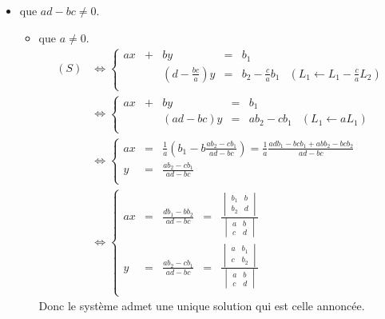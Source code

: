 \documentclass{article}
\renewenvironment{question_kholle}[2][ ]
{
	\subsection{\texorpdfstring{#2}{}}
	\notblank{#1}
	{
		\noindent #1
		\bigbreak
	}
	{}
	\begin{proof}
}
{
	\end{proof}
}
\begin{document}
\begin{question_kholle}
		\begin{itemize}[label=$\bullet$ Supposons]
			\item que $ad - bc \neq 0$.
			\begin{itemize}[label=$\bullet$ Supposons]
				\item que $a \neq 0$.
				\begin{equation*}
					\begin{aligned}
						(S)
						&\iff \left\{
							\begin{array}{cccccc}
								ax &+& by &=& b_1 \\
								&&\left(d - \frac{bc}{a}\right)y &=& b_2 - \frac{c}{a} b_1 &(L_1 \leftarrow L_1 - \frac{c}{a} L_2) \\
							\end{array}
						\right. \\
						&\iff \left\{
						\begin{array}{cccccc}
							ax &+& by &=& b_1 \\
							&&\left(ad - bc\right)y &=& a b_2 - c b_1 &(L_1 \leftarrow aL_1) \\
						\end{array}
						\right. \\
						&\iff \left\{
						\begin{array}{ccc}
							ax &=& \frac{1}{a} \left(b_1 - b\frac{ab_2 - cb_1}{ad - bc}\right) = \frac{1}{a} \frac{adb_1 - bcb_1 + abb_2 - bcb_2}{ad - bc} \\
							y &=& \frac{ab_2 - cb_1}{ad - bc} \\
						\end{array}
						\right. \\
						&\iff \left\{
						\begin{array}{ccccc}
							ax &=& \frac{db_1 - bb_2}{ad - bc} &=& \frac{\begin{vmatrix}b_1&b\\b_2&d\end{vmatrix}}{\begin{vmatrix}a&b\\c&d\end{vmatrix}} \\
							y &=& \frac{ab_2 - cb_1}{ad - bc} &=& \frac{\begin{vmatrix}a&b_1\\c&b_2\end{vmatrix}}{\begin{vmatrix}a&b\\c&d\end{vmatrix}}\\
						\end{array}
						\right.
					\end{aligned}
				\end{equation*}
				Donc le système admet une unique solution qui est celle annoncée.


\end{itemize}
\end{itemize}
\end{question_kholle}
\end{document}
